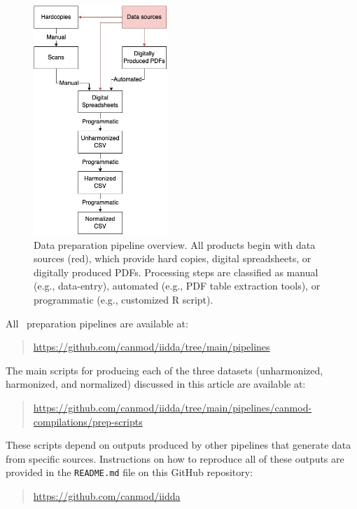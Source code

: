 \documentclass[12pt]{article}
\begin{document}
\begin{figure}
  \begin{center}
    \includegraphics[width=0.45\textwidth]{pipeline-overview.jpg}
  \end{center}
  \caption{Data preparation pipeline overview. All products begin with data sources (red), which provide hard copies, digital spreadsheets, or digitally produced PDFs. Processing steps are classified as manual (e.g., data-entry), automated (e.g., PDF table extraction tools), or programmatic (e.g., customized R script).}\label{fig:appendix-pipeline}
\end{figure}

All \datacronym\ preparation pipelines are available at:
\begin{quote}
  \url{https://github.com/canmod/iidda/tree/main/pipelines}
\end{quote}
The main scripts for producing each of the three datasets (unharmonized, harmonized, and normalized) discussed in this article are available at:
\begin{quote}
\url{https://github.com/canmod/iidda/tree/main/pipelines/canmod-compilations/prep-scripts}
\end{quote}
These scripts depend on outputs produced by other pipelines that generate data from specific sources. Instructions on how to reproduce all of these outputs are provided in the \texttt{README.md} file on this GitHub repository:
\begin{quote}
  \url{https://github.com/canmod/iidda}
\end{quote}
\end{document}
